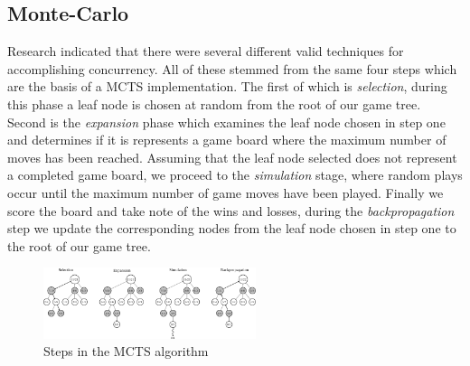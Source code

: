 \documentclass[conference]{IEEEtran}
\begin{document}
\subsection{Monte-Carlo}
Research indicated that there were several different valid techniques for accomplishing concurrency. All of these stemmed from the same four steps which are the basis of a MCTS implementation. The first of which is \textit{selection}, during this phase a leaf node is chosen at random from the root of our game tree. Second is the \textit{expansion} phase which examines the leaf node chosen in step one and determines if it is represents a game board where the maximum number of moves has been reached. Assuming that the leaf node selected does not represent a completed game board, we proceed to the \textit{simulation} stage, where random plays occur until the maximum number of game moves have been played. Finally we score the board and take note of the wins and losses, during the \textit{backpropagation} step we update the corresponding nodes from the leaf node chosen in step one to the root of our game tree.

\begin{figure}[h]
\includegraphics[width=235px]{MCTS}
\caption{Steps in the MCTS algorithm}
\centering
\end{figure}
\end{document}
